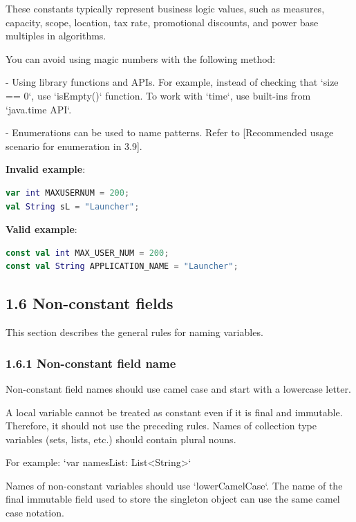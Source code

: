 These constants typically represent business logic values, such as measures, capacity, scope, location, tax rate, promotional discounts, and power base multiples in algorithms.

You can avoid using magic numbers with the following method:

- Using library functions and APIs. For example, instead of checking that `size == 0`, use `isEmpty()` function. To work with `time`, use built-ins from `java.time API`.

- Enumerations can be used to name patterns. Refer to [Recommended usage scenario for enumeration in 3.9].



\textbf{Invalid example}: 



\begin{lstlisting}[language=Kotlin]
var int MAXUSERNUM = 200;
val String sL = "Launcher";
\end{lstlisting}


\textbf{Valid example}:



\begin{lstlisting}[language=Kotlin]
const val int MAX_USER_NUM = 200;
const val String APPLICATION_NAME = "Launcher";
\end{lstlisting}


\subsection*{\textbf{1.6 Non-constant fields}}

This section describes the general rules for naming variables.

\subsubsection*{\textbf{1.6.1 Non-constant field name}}
\leavevmode\newline

Non-constant field names should use camel case and start with a lowercase letter.

A local variable cannot be treated as constant even if it is final and immutable. Therefore, it should not use the preceding rules. Names of collection type variables (sets, lists, etc.) should contain plural nouns.

For example: `var namesList: List<String>`



Names of non-constant variables should use `lowerCamelCase`. The name of the final immutable field used to store the singleton object can use the same camel case notation.



